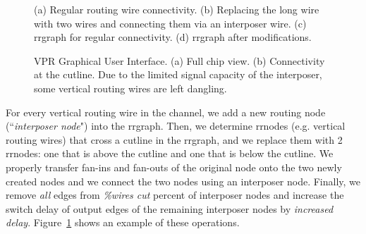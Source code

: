\documentclass{sig-alternate-2013}
\begin{document}
\begin{figure}[!t]
\caption{(a) Regular routing wire connectivity. (b) Replacing the long wire with two wires and connecting them via an interposer wire. (c) rrgraph for regular connectivity. (d) rrgraph after modifications.}
\label{fig:rrgraph_ops}
\end{figure}

\begin{figure}[!thpb]
\caption{VPR Graphical User Interface. (a) Full chip view. (b) Connectivity at the cutline. Due to the limited signal capacity of the interposer, some vertical routing wires are left dangling.}
\label{fig:vpr_interposer_gui}
\end{figure}

For every vertical routing wire in the channel, we add a new routing node (``\textit{interposer node}") into the rrgraph. Then, we determine rrnodes (e.g. vertical routing wires) that cross a cutline in the rrgraph, and we replace them with 2 rrnodes: one that is above the cutline and one that is below the cutline. We properly transfer fan-ins and fan-outs of the original node onto the two newly created nodes and we connect the two nodes using an interposer node. Finally, we remove \textit{all} edges from \textit{\%wires cut} percent of interposer nodes and increase the switch delay of output edges of the remaining interposer nodes by \textit{increased delay}. Figure~\ref{fig:rrgraph_ops} shows an example of these operations.
\end{document}
